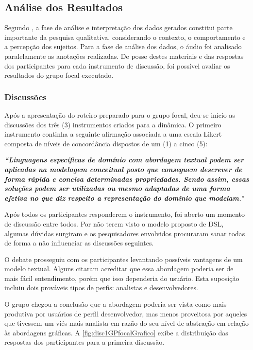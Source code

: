 \subsection{Análise dos Resultados}

Segundo , a fase de análise e interpretação dos dados gerados constitui parte importante da pesquisa qualitativa, considerando o contexto, o comportamento e a percepção dos sujeitos. 
Para a fase de análise dos dados, o áudio foi analisado paralelamente as anotações realizadas.
De posse destes materiais e das respostas dos participantes para cada instrumento de discussão, foi possível avaliar os resultados do grupo focal executado.

\subsubsection{Discussões}

Após a apresentação do roteiro preparado para o grupo focal, deu-se início as discussões dos três (3) instrumentos criados para a dinâmica.
O primeiro instrumento continha a seguinte afirmação associada a uma escala Likert composta de níveis de concordância dispostos de um (1) a cinco (5):

\textit{\textbf{``Linguagens específicas de domínio com abordagem textual podem ser aplicadas na modelagem conceitual posto que conseguem descrever de forma rápida e concisa determinadas propriedades.
Sendo assim, essas soluções podem ser utilizadas ou mesmo adaptadas de uma forma efetiva no que diz respeito a representação do domínio que modelam.}}''

Após todos os participantes responderem o instrumento, foi aberto um momento de discussão entre todos. 
Por não terem visto o modelo proposto de \ac{DSL}, algumas dúvidas surgiram e os pesquisadores envolvidos procuraram sanar todas de forma a não influenciar as discussões seguintes.

O debate prosseguiu com os participantes levantando possíveis vantagens de um modelo textual.
Alguns citaram acreditar que essa abordagem poderia ser de mais fácil entendimento, porém que isso dependeria do usuário.
Esta suposição incluiu dois prováveis tipos de perfis: analistas e desenvolvedores.

O grupo chegou a conclusão que a abordagem poderia ser vista como mais produtiva por usuários de perfil desenvolvedor, mas menos proveitosa por aqueles que tivessem um viés mais analista em razão do seu nível de abstração em relação às abordagens gráficas.
A \autoref{fig:disc1GPfocalGrafico} exibe a distribuição das respostas dos participantes para a primeira discussão.

